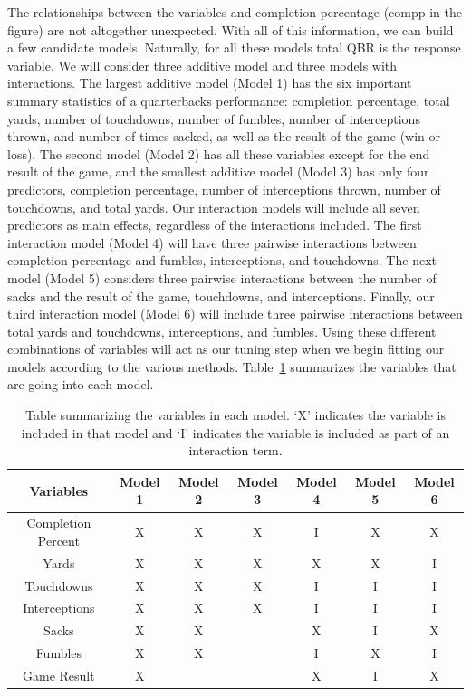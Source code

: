 \documentclass[12pt]{article}\usepackage[]{graphicx}\usepackage[]{color}
\begin{document}
The relationships between the variables and completion percentage (compp in the figure) are not altogether unexpected. With all of this information, we can build a few candidate models. Naturally, for all these models total QBR is the response variable. We will consider three additive model and three models with interactions. The largest additive model (Model 1) has the six important summary statistics of a quarterbacks performance: completion percentage, total yards, number of touchdowns, number of fumbles, number of interceptions thrown, and number of times sacked, as well as the result of the game (win or loss). The second model (Model 2) has all these variables except for the end result of the game, and the smallest additive model (Model 3) has only four predictors, completion percentage, number of interceptions thrown, number of touchdowns, and total yards. Our interaction models will include all seven predictors as main effects, regardless of the interactions included. The first interaction model (Model 4) will have three pairwise interactions between completion percentage and fumbles, interceptions, and touchdowns. The next model (Model 5) considers three pairwise interactions between the number of sacks and the result of the game, touchdowns, and interceptions. Finally, our third interaction model (Model 6) will include three pairwise interactions between total yards and touchdowns, interceptions, and fumbles. Using these different combinations of variables will act as our tuning step when we begin fitting our models according to the various methods. Table~\ref{tab:models} summarizes the variables that are going into each model.

\begin{table}[h]
\centering
\begin{tabular}{|c|c|c|c|c|c|c|}
\hline
Variables & Model 1 & Model 2 & Model 3 & Model 4 & Model 5 & Model 6\\
\hline
Completion Percent & X & X & X & I & X & X \\
\hline
Yards & X & X & X & X & X & I \\
\hline
Touchdowns & X & X & X & I & I & I \\
\hline
Interceptions & X & X & X & I & I & I \\
\hline
Sacks & X & X &  & X & I & X \\
\hline
Fumbles & X & X &  & I & X & I \\
\hline
Game Result & X & & & X & I & X\\
\hline
\end{tabular}
\captionsetup{font=footnotesize,labelfont=footnotesize}
\caption{\label{tab:models} Table summarizing the variables in each model. `X' indicates the variable is included in that model and `I' indicates the variable is included as part of an interaction term.}
\end{table}
\end{document}
